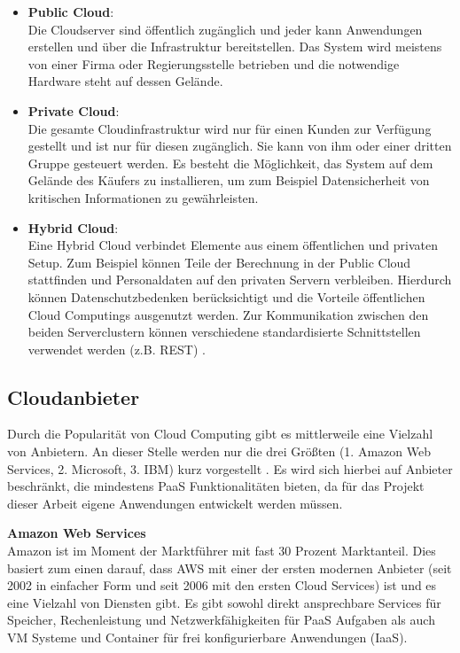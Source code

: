 \begin{itemize}
	\item \textbf{Public Cloud}:\\
	Die Cloudserver sind öffentlich zugänglich und jeder kann Anwendungen erstellen und über die Infrastruktur bereitstellen. Das System wird meistens von einer Firma oder Regierungsstelle betrieben und die notwendige Hardware steht auf dessen Gelände. 
	\item \textbf{Private Cloud}:\\
	Die gesamte Cloudinfrastruktur wird nur für einen Kunden zur Verfügung gestellt und ist nur für diesen zugänglich. Sie kann von ihm oder einer dritten Gruppe gesteuert werden. Es besteht die Möglichkeit, das System auf dem Gelände des Käufers zu installieren, um zum Beispiel Datensicherheit von kritischen Informationen zu gewährleisten. 
	\item \textbf{Hybrid Cloud}:\\
	Eine Hybrid Cloud verbindet Elemente aus einem öffentlichen und privaten Setup. Zum Beispiel können Teile der Berechnung in der Public Cloud stattfinden und Personaldaten auf den privaten Servern verbleiben. Hierdurch können Datenschutzbedenken berücksichtigt und die Vorteile öffentlichen Cloud Computings ausgenutzt werden. Zur Kommunikation zwischen den beiden Serverclustern können verschiedene standardisierte Schnittstellen verwendet werden (z.B. REST)  \parencite{rafaels.2015}.
\end{itemize}

\subsection{Cloudanbieter} \label{subsec:cloudprovider}
Durch die Popularität von Cloud Computing gibt es mittlerweile eine Vielzahl von Anbietern. An dieser Stelle werden nur die drei Größten (1. Amazon Web Services, 2. Microsoft, 3. IBM) kurz vorgestellt \parencite{statistia.2016}. Es wird sich hierbei auf Anbieter beschränkt, die mindestens \acs{PaaS} Funktionalitäten bieten, da für das Projekt dieser Arbeit eigene Anwendungen entwickelt werden müssen.


\textbf{Amazon Web Services}\\
Amazon ist im Moment der Marktführer mit fast 30 Prozent Marktanteil. Dies basiert zum einen darauf, dass \ac{AWS} mit einer der ersten modernen Anbieter (seit 2002 in einfacher Form und seit 2006 mit den ersten Cloud Services) ist und es eine Vielzahl von Diensten gibt. Es gibt sowohl direkt ansprechbare Services für Speicher, Rechenleistung und Netzwerkfähigkeiten für \acs{PaaS} Aufgaben als auch VM Systeme und Container für frei konfigurierbare Anwendungen (\acs{IaaS}).

